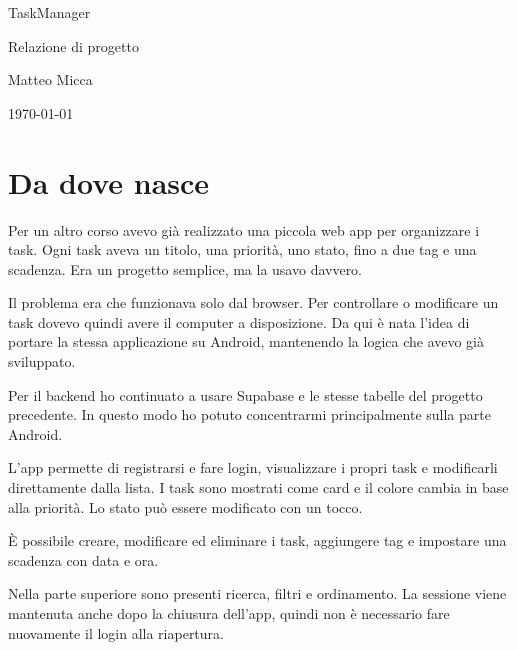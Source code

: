 \documentclass[11pt,a4paper]{article}
\begin{document}
\thispagestyle{empty}

\begin{center}
  \vspace*{1.5cm}

  {\LARGE TaskManager}

  \vspace{0.6em}

  {\large Relazione di progetto}

  \vspace{2.2em}

Matteo Micca

  \vspace{2em}



  \vspace{1em}

  \today
\end{center}

\newpage

\tableofcontents

\newpage


\section{Da dove nasce}

Per un altro corso avevo già realizzato una piccola web app per organizzare i
task. Ogni task aveva un titolo, una priorità, uno stato, fino a due tag e una
scadenza. Era un progetto semplice, ma la usavo davvero.

Il problema era che funzionava solo dal browser. Per controllare o modificare un
task dovevo quindi avere il computer a disposizione. Da qui è nata l'idea di
portare la stessa applicazione su Android, mantenendo la logica che avevo già
sviluppato.

Per il backend ho continuato a usare Supabase e le stesse tabelle del progetto
precedente. In questo modo ho potuto concentrarmi principalmente sulla parte
Android.

L'app permette di registrarsi e fare login, visualizzare i propri task e
modificarli direttamente dalla lista. I task sono mostrati come card e il
colore cambia in base alla priorità. Lo stato può essere modificato con un
tocco.

È possibile creare, modificare ed eliminare i task, aggiungere tag e impostare
una scadenza con data e ora.

Nella parte superiore sono presenti ricerca, filtri e ordinamento. La sessione
viene mantenuta anche dopo la chiusura dell'app, quindi non è necessario fare
nuovamente il login alla riapertura.
\end{document}
